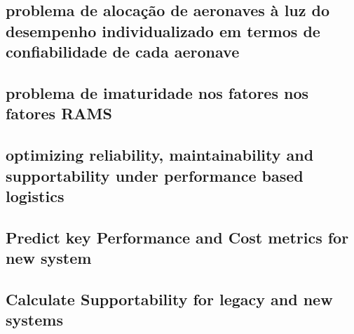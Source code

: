 \documentclass{article}
\begin{document}
\subsection{problema de alocação de aeronaves à luz do desempenho individualizado em termos de confiabilidade de cada aeronave}

\subsection{problema de imaturidade nos fatores nos fatores RAMS}

\subsection{optimizing reliability, maintainability and supportability under performance based logistics}

\subsection{Predict key Performance and Cost metrics for new system}

\subsection{Calculate Supportability for legacy and new systems}
\end{document}
